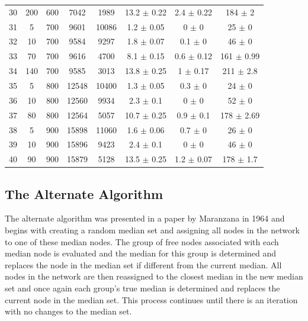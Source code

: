 \documentclass[11pt]{article}
\begin{document}
\begin{table}[]
{\begin{tabular}{cccccccc}
				30 & 200 & 600 & 7042 & 1989 & 13.2 $\pm$ 0.22 & 2.4 $\pm$ 0.22 & 184 $\pm$ 2 \\
				\rowcolor[HTML]{EFEFEF} 
				31 & 5 & 700 & 9601 & 10086 & 1.2 $\pm$ 0.05 & 0 $\pm$ 0 & 25 $\pm$ 0 \\
				\rowcolor[HTML]{EFEFEF} 
				32 & 10 & 700 & 9584 & 9297 & 1.8 $\pm$ 0.07 & 0.1 $\pm$ 0 & 46 $\pm$ 0 \\
				\rowcolor[HTML]{EFEFEF} 
				33 & 70 & 700 & 9616 & 4700 & 8.1 $\pm$ 0.15 & 0.6 $\pm$ 0.12 & 161 $\pm$ 0.99 \\
				\rowcolor[HTML]{EFEFEF} 
				34 & 140 & 700 & 9585 & 3013 & 13.8 $\pm$ 0.25 & 1 $\pm$ 0.17 & 211 $\pm$ 2.8 \\
				35 & 5 & 800 & 12548 & 10400 & 1.3 $\pm$ 0.05 & 0.3 $\pm$ 0 & 24 $\pm$ 0 \\
				36 & 10 & 800 & 12560 & 9934 & 2.3 $\pm$ 0.1 & 0 $\pm$ 0 & 52 $\pm$ 0 \\
				37 & 80 & 800 & 12564 & 5057 & 10.7 $\pm$ 0.25 & 0.9 $\pm$ 0.1 & 178 $\pm$ 2.69 \\
				\rowcolor[HTML]{EFEFEF} 
				38 & 5 & 900 & 15898 & 11060 & 1.6 $\pm$ 0.06 & 0.7 $\pm$ 0 & 26 $\pm$ 0 \\
				\rowcolor[HTML]{EFEFEF} 
				39 & 10 & 900 & 15896 & 9423 & 2.4 $\pm$ 0.1 & 0 $\pm$ 0 & 46 $\pm$ 0 \\
				\rowcolor[HTML]{EFEFEF} 
				40 & 90 & 900 & 15879 & 5128 & 13.5 $\pm$ 0.25 & 1.2 $\pm$ 0.07 & 178 $\pm$ 1.7
			\end{tabular}%
		}
	\end{table}
	
	
	
	\subsection{The Alternate Algorithm} \label{alternatealgo}
	The alternate algorithm was presented in a paper by Maranzana  in 1964 \cite{MARA64} and begins with creating a random median set and assigning all nodes in the network to one of these median nodes.  The group of free nodes associated with each median node is evaluated and the median for this group is determined and replaces the node in the median set if different from the current median.  All nodes in the network are then reassigned to the closest median in the new median set and once again each group's true median is determined and replaces the current node in the median set.  This process continues until there is an iteration with no changes to the median set.
	
\end{document}
